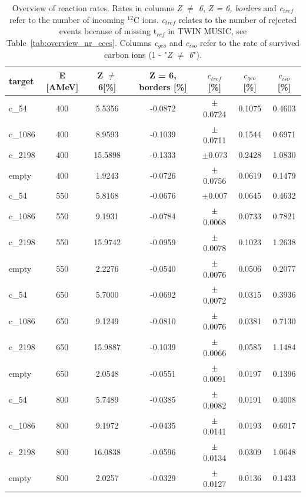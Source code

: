\begin{table}
\centering
\begin{tabularx}{\textwidth}{lcccccc}
\toprule
target &  E [AMeV] &  Z $\neq$ 6[\%] &  Z = 6, borders [\%] &  $c_{tref}$ [\%] &  $c_{geo}$ [\%] &  $c_{iso}$ [\%] \\
\midrule
   c\_54 &     400 &     5.5356 &     -0.0872 &  $\pm$0.0724 &  0.1075 &  0.4603 \\
 c\_1086 &     400 &     8.9593 &     -0.1039 &  $\pm$0.0711 &  0.1544 &  0.6971 \\
 c\_2198 &     400 &    15.5898 &     -0.1333 &   $\pm$0.073 &  0.2428 &  1.0830 \\
  empty &     400 &     1.9243 &     -0.0726 &  $\pm$0.0756 &  0.0619 &  0.1479 \\
   c\_54 &     550 &     5.8168 &     -0.0676 &   $\pm$0.007 &  0.0645 &  0.4632 \\
 c\_1086 &     550 &     9.1931 &     -0.0784 &  $\pm$0.0068 &  0.0733 &  0.7821 \\
 c\_2198 &     550 &    15.9742 &     -0.0959 &  $\pm$0.0078 &  0.1023 &  1.2638 \\
  empty &     550 &     2.2276 &     -0.0540 &  $\pm$0.0076 &  0.0506 &  0.2077 \\
   c\_54 &     650 &     5.7000 &     -0.0692 &  $\pm$0.0072 &  0.0315 &  0.3936 \\
 c\_1086 &     650 &     9.1249 &     -0.0810 &  $\pm$0.0076 &  0.0381 &  0.7130 \\
 c\_2198 &     650 &    15.9887 &     -0.1039 &  $\pm$0.0066 &  0.0585 &  1.1484 \\
  empty &     650 &     2.0548 &     -0.0551 &  $\pm$0.0091 &  0.0197 &  0.1396 \\
   c\_54 &     800 &     5.7489 &     -0.0385 &  $\pm$0.0082 &  0.0191 &  0.4008 \\
 c\_1086 &     800 &     9.1972 &     -0.0435 &  $\pm$0.0141 &  0.0193 &  0.6017 \\
 c\_2198 &     800 &    16.0838 &     -0.0596 &  $\pm$0.0134 &  0.0309 &  1.0648 \\
  empty &     800 &     2.0257 &     -0.0329 &  $\pm$0.0127 &  0.0136 &  0.1433 \\
\bottomrule
\end{tabularx}
\caption{Overview of reaction rates. Rates in columns \textit{Z $\neq$ 6}, \textit{Z = 6, borders} and \textit{c$_{tref}$} refer to the number of incoming $^{12}$C ions. \textit{c$_{tref}$} relates to the number of rejected events because of missing t$_{ref}$ in TWIN MUSIC, see Table~\ref{tab:overview_nr_cccs}. Columns \textit{c$_{geo}$} and \textit{c$_{iso}$} refer to the rate of survived carbon ions (1 - "\textit{Z $\neq$ 6}").}
\label{tab:cs_contr}
\end{table}
\clearpage

